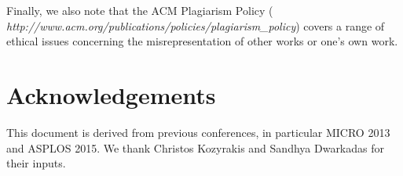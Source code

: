 \documentclass{sig-alternate}
\begin{document}
Finally, we also note that the ACM Plagiarism Policy ({\em
http://www.acm.org/publications/policies/plagiarism\_policy}) covers a
range of ethical issues concerning the misrepresentation of other works or
one's own work.

\section{Acknowledgements}
This document is derived from previous conferences, in particular
MICRO 2013 and ASPLOS 2015.  We thank Christos Kozyrakis and Sandhya
Dwarkadas for their inputs.






\end{document}
